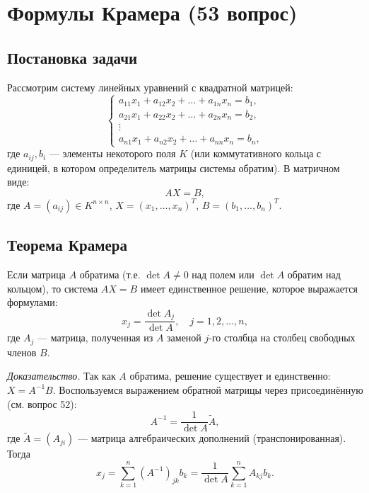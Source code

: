 \documentclass[a4paper,12pt]{article}
\theoremstyle{definition}
\theoremstyle{plain}
\theoremstyle{remark}
\begin{document}
	
	
	\newpage
	\section{Формулы Крамера (53 вопрос)}
	
	\subsection{Постановка задачи}
	
	Рассмотрим систему линейных уравнений с квадратной матрицей:
	\[
	\begin{cases}
		a_{11}x_1 + a_{12}x_2 + \dots + a_{1n}x_n = b_1, \\
		a_{21}x_1 + a_{22}x_2 + \dots + a_{2n}x_n = b_2, \\
		\vdots \\
		a_{n1}x_1 + a_{n2}x_2 + \dots + a_{nn}x_n = b_n,
	\end{cases}
	\]
	где \(a_{ij}, b_i\) — элементы некоторого поля \(K\) (или коммутативного кольца с единицей, в котором определитель матрицы системы обратим). В матричном виде:
	\[
	A X = B,
	\]
	где \(A = (a_{ij}) \in K^{n \times n}\), \(X = (x_1, \dots, x_n)^T\), \(B = (b_1, \dots, b_n)^T\).
	
	\subsection{Теорема Крамера}
	
	\begin{tcolorbox}[colback=blue!5, colframe=blue!40!black, title=Теорема (Формулы Крамера)]
		Если матрица \(A\) обратима (т.е. \(\det A \neq 0\) над полем или \(\det A\) обратим над кольцом), то система \(AX = B\) имеет единственное решение, которое выражается формулами:
		\[
		x_j = \frac{\det A_j}{\det A}, \quad j = 1, 2, \dots, n,
		\]
		где \(A_j\) — матрица, полученная из \(A\) заменой \(j\)-го столбца на столбец свободных членов \(B\).
	\end{tcolorbox}
	
	\medskip
	\textit{Доказательство.}
	Так как \(A\) обратима, решение существует и единственно: \(X = A^{-1}B\). Воспользуемся выражением обратной матрицы через присоединённую (см. вопрос 52):
	\[
	A^{-1} = \frac{1}{\det A} \tilde{A},
	\]
	где \(\tilde{A} = (A_{ji})\) — матрица алгебраических дополнений (транспонированная). Тогда
	\[
	x_j = \sum_{k=1}^n (A^{-1})_{jk} b_k = \frac{1}{\det A} \sum_{k=1}^n A_{kj} b_k.
	\]
	
\end{document}
